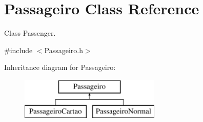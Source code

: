 \hypertarget{class_passageiro}{}\section{Passageiro Class Reference}
\label{class_passageiro}


Class Passenger.  




{\ttfamily \#include $<$Passageiro.\+h$>$}

Inheritance diagram for Passageiro\+:\begin{figure}[H]
\begin{center}
\leavevmode
\includegraphics[height=2.000000cm]{class_passageiro}
\end{center}
\end{figure}

